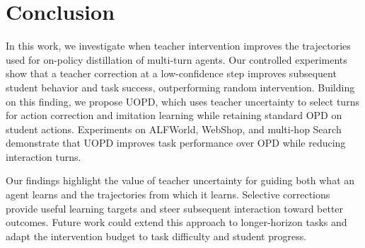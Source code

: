 \section{Conclusion}
\label{sec:conclusion}

In this work, we investigate when teacher intervention improves the trajectories used for
on-policy distillation of multi-turn agents. Our controlled experiments show that a teacher
correction at a low-confidence step improves subsequent student behavior and task success,
outperforming random intervention. Building on this
finding, we propose UOPD, which uses teacher uncertainty to select turns for action correction
and imitation learning while retaining standard OPD on student actions. Experiments on
ALFWorld, WebShop, and multi-hop Search demonstrate that UOPD improves task
performance over OPD while reducing interaction turns.

Our findings highlight the value of teacher uncertainty for guiding both what an agent learns
and the trajectories from which it learns. Selective corrections provide useful learning targets
and steer subsequent interaction toward better outcomes. Future work could extend this approach
to longer-horizon tasks and adapt the intervention budget to task difficulty and student progress.
